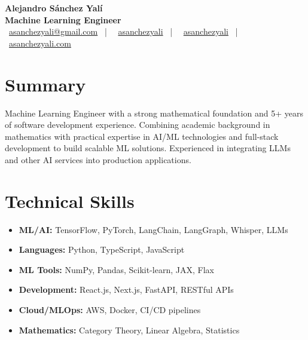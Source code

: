 \documentclass[letterpaper,11pt]{article}
\begin{document}
\begin{center}
\textbf{\Huge Alejandro Sánchez Yalí}\\[0.3em]
\textbf{\Large Machine Learning Engineer}\\[0.5em]
\small
\faEnvelope\ \href{mailto:asanchezyali@gmail.com}{asanchezyali@gmail.com}  ~|~
\faLinkedin\ \href{https://www.linkedin.com/in/asanchezyali}{asanchezyali} ~|~
\faGithub\ \href{https://github.com/asanchezyali}{asanchezyali}  ~|~
\faGlobe\ \href{https://asanchezyali.com}{asanchezyali.com}
\end{center}

\section{Summary}
Machine Learning Engineer with a strong mathematical foundation and 5+ years of software development experience. Combining academic background in mathematics with practical expertise in AI/ML technologies and full-stack development to build scalable ML solutions. Experienced in integrating LLMs and other AI services into production applications.

\section{Technical Skills}
\begin{itemize}[leftmargin=*]
  \item \textbf{ML/AI:} TensorFlow, PyTorch, LangChain, LangGraph, Whisper, LLMs
  \item \textbf{Languages:} Python, TypeScript, JavaScript
  \item \textbf{ML Tools:} NumPy, Pandas, Scikit-learn, JAX, Flax
  \item \textbf{Development:} React.js, Next.js, FastAPI, RESTful APIs
  \item \textbf{Cloud/MLOps:} AWS, Docker, CI/CD pipelines
  \item \textbf{Mathematics:} Category Theory, Linear Algebra, Statistics
\end{itemize}
\end{document}
